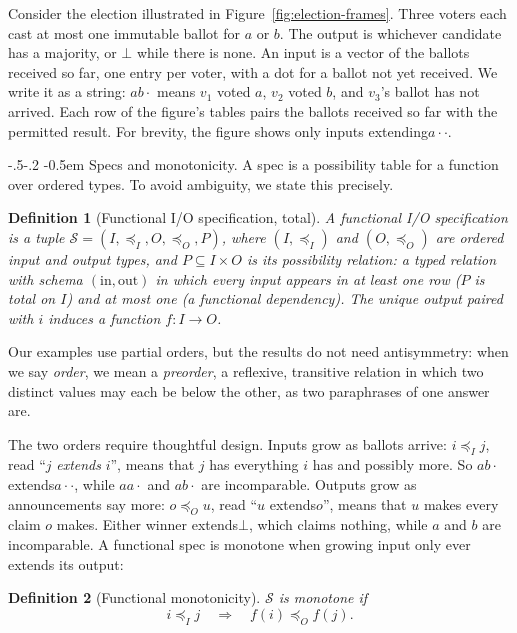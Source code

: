 \documentclass[sigconf]{cidr-2027}
\makeatletter
\newtheorem{definition}{Definition}
\theoremstyle{remark}
\renewcommand\paragraph{\@startsection{paragraph}{4}{\z@}%
  {-.5\baselineskip \@plus -2\p@ \@minus -.2\p@}%
  {-0.5em}%
  {\normalfont\bfseries}}
\newcommand{\InputOrd}{\preceq_I}
\newcommand{\OutputOrd}{\preceq_O}
\newcommand{\inrel}{extends\xspace}          %
\newcommand{\inrelpart}{extending\xspace}    %
\newcommand{\outrel}{extends\xspace}          %
\newcommand{\Spec}{\mathcal{S}}
\newcommand{\spectype}[1][]{I/O specification#1\xspace}
\makeatother
\begin{document}
Consider the election illustrated in
Figure~\ref{fig:election-frames}.  Three voters each cast at most one immutable
ballot for $a$ or $b$.  The output is whichever candidate has a majority, or
$\bot$ while there is none.  An input is a vector of the ballots received so
far, one entry per voter, with a dot for a ballot not yet received.  We write
it as a string: $ab\cdot$ means $v_1$ voted $a$, $v_2$ voted $b$, and $v_3$'s
ballot has not arrived.  Each row of the figure's tables pairs the ballots
received so far with the permitted result.  For brevity, the figure shows only
inputs \inrelpart $a\cdot\cdot$.

\paragraph{Specs and monotonicity.}
A spec is a possibility table for a function over ordered types.
To avoid ambiguity, we state this precisely.

\begin{definition}[Functional \spectype, total]
\label{def:functional-specification}
A \emph{functional \spectype} is a tuple
$\Spec=(I,\InputOrd,O,\OutputOrd,P)$,
where $(I,\InputOrd)$ and $(O,\OutputOrd)$ are ordered input and
output types, and $P\subseteq I\times O$ is its \emph{possibility relation}:
a typed relation with schema $(\mathrm{in},\mathrm{out})$ in which every
input appears in at least one row ($P$ is \emph{total} on $I$) and at most one
(a functional dependency).  The unique output paired with $i$ induces a
function $f:I\to O$.
\end{definition}

Our examples use partial orders, but the results do not need antisymmetry:
when we say \emph{order}, we mean a \emph{preorder}, a reflexive, transitive
relation in which two distinct values may each be below the other, as two
paraphrases of one answer are.

The two orders require thoughtful design.
Inputs grow as ballots arrive: $i\InputOrd j$, read ``$j$ \emph{\inrel} $i$'', means that
$j$ has everything $i$ has and possibly more. So $ab\cdot$ \inrel $a\cdot\cdot$,
while $aa\cdot$ and $ab\cdot$ are incomparable. Outputs grow as announcements
say more: $o\OutputOrd u$, read ``$u$ \outrel $o$'', means that $u$ makes every
claim $o$ makes. Either winner \outrel $\bot$, which claims nothing, while $a$
and $b$ are incomparable. A functional spec is monotone when growing input only
ever extends its output:

\begin{definition}[Functional monotonicity]
\label{def:functional-monotonicity}
$\Spec$ is \emph{monotone} if
\begin{equation}
  i\InputOrd j
  \quad\Longrightarrow\quad
  f(i)\OutputOrd f(j).
  \label{eq:functional-monotonicity}
\end{equation}
\end{definition}
\end{document}
